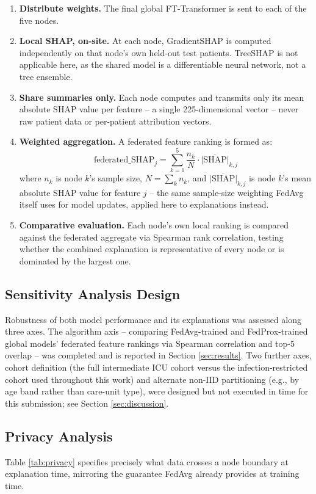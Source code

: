 \documentclass{svproc}
\begin{document}
\begin{enumerate}
\item \textbf{Distribute weights.} The final global FT-Transformer is sent to each of the five nodes.
\item \textbf{Local SHAP, on-site.} At each node, GradientSHAP is computed independently on that node's own held-out test patients. TreeSHAP is not applicable here, as the shared model is a differentiable neural network, not a tree ensemble.
\item \textbf{Share summaries only.} Each node computes and transmits only its mean absolute SHAP value per feature -- a single 225-dimensional vector -- never raw patient data or per-patient attribution vectors.
\item \textbf{Weighted aggregation.} A federated feature ranking is formed as:
\begin{equation}
\text{federated\_SHAP}_j = \sum_{k=1}^{5} \frac{n_k}{N} \cdot \overline{|\text{SHAP}|}_{k,j}
\label{eq:agg}
\end{equation}
where $n_k$ is node $k$'s sample size, $N = \sum_k n_k$, and $\overline{|\text{SHAP}|}_{k,j}$ is node $k$'s mean absolute SHAP value for feature $j$ -- the same sample-size weighting FedAvg itself uses for model updates, applied here to explanations instead.
\item \textbf{Comparative evaluation.} Each node's own local ranking is compared against the federated aggregate via Spearman rank correlation, testing whether the combined explanation is representative of every node or is dominated by the largest one.
\end{enumerate}

\subsection{Sensitivity Analysis Design}
Robustness of both model performance and its explanations was assessed along three axes. The algorithm axis -- comparing FedAvg-trained and FedProx-trained global models' federated feature rankings via Spearman correlation and top-5 overlap -- was completed and is reported in Section \ref{sec:results}. Two further axes, cohort definition (the full intermediate ICU cohort versus the infection-restricted cohort used throughout this work) and alternate non-IID partitioning (e.g., by age band rather than care-unit type), were designed but not executed in time for this submission; see Section \ref{sec:discussion}.

\subsection{Privacy Analysis}
Table \ref{tab:privacy} specifies precisely what data crosses a node boundary at explanation time, mirroring the guarantee FedAvg already provides at training time.
\end{document}
